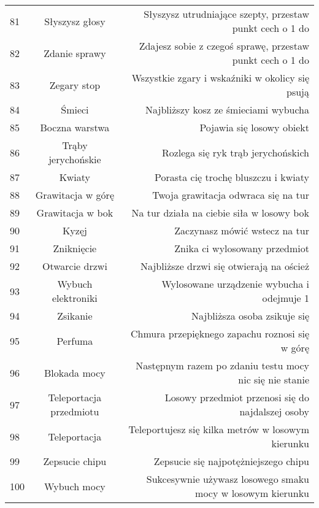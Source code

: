 \begin{longtabu}{ l c r }
81			&	Słyszysz głosy			&	Słyszysz utrudniające szepty, przestaw punkt cech o 1 do \aba \\
82			&	Zdanie sprawy			&	Zdajesz sobie z czegoś sprawę, przestaw punkt cech o 1 do \abi \\
83			&	Zegary stop				&	Wszystkie zgary i wskaźniki w okolicy się psują \\
84			&	Śmieci					&	Najbliższy kosz ze śmieciami wybucha \\
85			&	Boczna warstwa			&	Pojawia się losowy obiekt \\
86			&	Trąby jerychońskie		&	Rozlega się ryk trąb jerychońskich \\
87			&	Kwiaty					&	Porasta cię trochę bluszczu i kwiaty \\
88			&	Grawitacja w górę		&	Twoja grawitacja odwraca się na \diiii tur \\
89			&	Grawitacja w bok		&	Na \diiii tur działa na ciebie siła w losowy bok \\
90			&	Kyzęj					&	Zaczynasz mówić wstecz na \diiii tur \\
91			&	Zniknięcie				&	Znika ci wylosowany przedmiot \\
92			&	Otwarcie drzwi			&	Najbliższe drzwi się otwierają na oścież \\
93			&	Wybuch elektroniki		&	Wylosowane urządzenie wybucha i odejmuje 1 \abzyc \\
94			&	Zsikanie				&	Najbliższa osoba zsikuje się \\
95			&	Perfuma					&	Chmura przepięknego zapachu roznosi się w górę \\
96			&	Blokada mocy			&	Następnym razem po zdaniu testu mocy nic się nie stanie \\
97			&	Teleportacja przedmiotu	&	Losowy przedmiot przenosi się do najdalszej osoby \\
98			&	Teleportacja			&	Teleportujesz się kilka metrów w losowym kierunku \\
99			&	Zepsucie chipu			&	Zepsucie się najpotężniejszego chipu \\
100			&	Wybuch mocy				&	Sukcesywnie używasz losowego smaku mocy w losowym kierunku \\
\end{longtabu}








